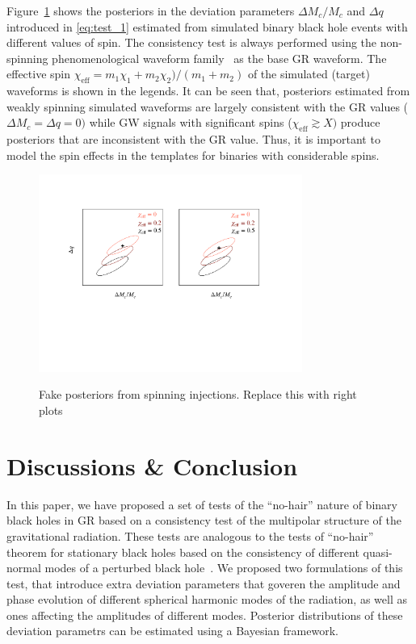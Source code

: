 \documentclass[prd,preprintnumbers,twocolumn,eqsecnum,floatfix,a4paper,nofootinbib,superscriptaddress]{revtex4}
\begin{document}
Figure~\ref{fig:posterior_spin} shows the posteriors in the deviation parameters $\Delta M_c/M_c$ and $\Delta q$ introduced in \eqref{eq:test_1} estimated from simulated binary black hole events with different values of spin. The consistency test is always performed using the non-spinning phenomenological waveform family~\cite{Mehta} as the base GR waveform. The effective spin $\chi_\mathrm{eff} = m_1 \chi_1 + m_2 \chi_2)/(m_1+m_2)$ of the simulated (target) waveforms is shown in the legends. It can be seen that, posteriors estimated from weakly spinning simulated waveforms are largely consistent with the GR values ($\Delta M_c = \Delta q = 0)$ while GW signals with significant spins ($\chi_\mathrm{eff} \gtrsim X)$ produce posteriors that are inconsistent with the GR value. Thus, it is important to model the spin effects in the templates for binaries with considerable spins. 

\begin{figure}[htb] 
\begin{center}
\includegraphics[width=3.4in]{figs/cartoon_plot.pdf}
\label{fig:posterior_spin}
\caption{Fake posteriors from spinning injections. Replace this with right plots}
\end{center} 
\end{figure}

\section{Discussions \& Conclusion}
In this paper, we have proposed a set of tests of the ``no-hair'' nature of binary black holes in GR based on a consistency test of the multipolar structure of the gravitational radiation. These tests are analogous to the tests of ``no-hair'' theorem for stationary black holes based on the consistency of different quasi-normal modes of a perturbed black hole~\cite{xx}. We proposed two formulations of this test, that introduce extra deviation parameters that goveren the amplitude and phase evolution of different spherical harmonic modes of the radiation, as well as ones affecting the amplitudes of different modes. Posterior distributions of these deviation parametrs can be estimated using a Bayesian framework. 
\end{document}
